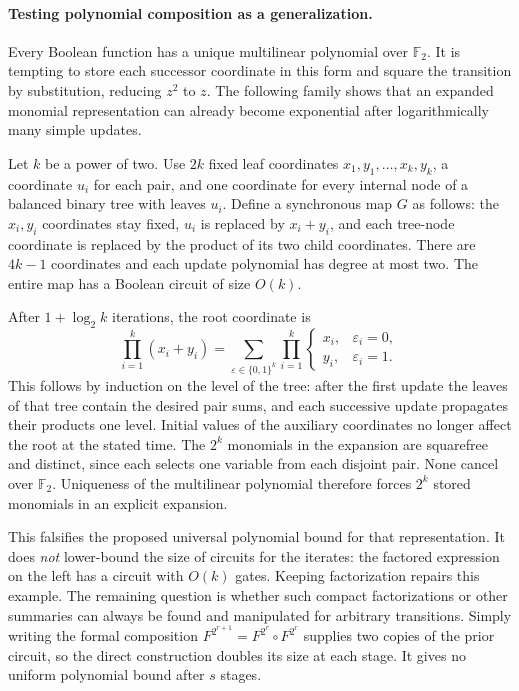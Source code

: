 \documentclass[11pt]{article}
\begin{document}
\paragraph{Testing polynomial composition as a generalization.}
Every Boolean function has a unique multilinear polynomial over
$\mathbb F_2$. It is tempting to store each successor coordinate in this
form and square the transition by substitution, reducing $z^2$ to $z$.
The following family shows that an expanded monomial representation can
already become exponential after logarithmically many simple updates.

Let $k$ be a power of two. Use $2k$ fixed leaf coordinates
$x_1,y_1,\ldots,x_k,y_k$, a coordinate $u_i$ for each pair, and one coordinate
for every internal node of a balanced binary tree with leaves $u_i$.
Define a synchronous map $G$ as follows: the $x_i,y_i$ coordinates stay fixed,
$u_i$ is replaced by $x_i+y_i$, and each tree-node coordinate is replaced by
the product of its two child coordinates. There are $4k-1$ coordinates and
each update polynomial has degree at most two. The entire map has a
Boolean circuit of size $O(k)$.

After $1+\log_2 k$ iterations, the root coordinate is
\begin{equation}\label{a14:expansion}
                   \prod_{i=1}^k(x_i+y_i)
       =\sum_{\varepsilon\in\{0,1\}^k}
          \prod_{i=1}^k
          \begin{cases}x_i,&\varepsilon_i=0,\\y_i,&\varepsilon_i=1.
          \end{cases}
\end{equation}
This follows by induction on the level of the tree: after the first update
the leaves of that tree contain the desired pair sums, and each successive
update propagates their products one level. Initial values of the auxiliary
coordinates no longer affect the root at the stated time. The $2^k$
monomials in the expansion are squarefree and distinct, since each selects
one variable from each disjoint pair. None cancel over $\mathbb F_2$.
Uniqueness of the multilinear polynomial therefore forces $2^k$ stored
monomials in an explicit expansion.

This falsifies the proposed universal polynomial bound for that representation.
It does \emph{not} lower-bound the size of circuits for the iterates: the
factored expression on the left has a circuit with $O(k)$ gates. Keeping
factorization repairs this example. The remaining question is whether such
compact factorizations or other summaries can always be found and manipulated
for arbitrary transitions. Simply writing the formal composition
$F^{2^{r+1}}=F^{2^r}\circ F^{2^r}$ supplies two copies of the prior circuit,
so the direct construction doubles its size at each stage. It gives no
uniform polynomial bound after $s$ stages.
\end{document}
